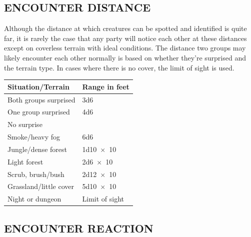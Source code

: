 \begin{multicols}{2}
\begin{minipage}{\columnwidth}
\end{minipage}

\section{ENCOUNTER DISTANCE}

Although the distance at which creatures can be spotted and identified is quite far, it is rarely the case that any party will notice each other at these distances except on coverless terrain with ideal conditions.  The distance two groups may likely encounter each other normally is based on whether they're surprised and the terrain type.  In cases where there is no cover, the limit of sight is used.

\noindent
\begin{minipage}{\columnwidth}

\label{encounterdistance}
\noindent
\begin{tabular}{|p{}|p{}|}
\hline
Situation/Terrain	& Range in feet \\
\hline\hline
\rowcolor[gray]{.9}Both groups surprised	& 3d6 \\
One group surprised& 	4d6 \\
\rowcolor[gray]{.9}No surprise	 & \\
\rowcolor[gray]{.9}\hspace{2em}Smoke/heavy fog	& 6d6 \\
\hspace{2em}Jungle/dense forest	& 1d10~$\times$~10 \\
\rowcolor[gray]{.9}\hspace{2em}Light forest	& 2d6~$\times$~10 \\
\hspace{2em}Scrub, brush/bush	& 2d12~$\times$~10 \\
\rowcolor[gray]{.9}\hspace{2em}Grassland/little cover	& 5d10~$\times$~10 \\
\hspace{2em}Night or dungeon	& Limit of sight \\
\hline
\end{tabular}

\end{minipage}

\subsection{ENCOUNTER REACTION}


\end{multicols}
